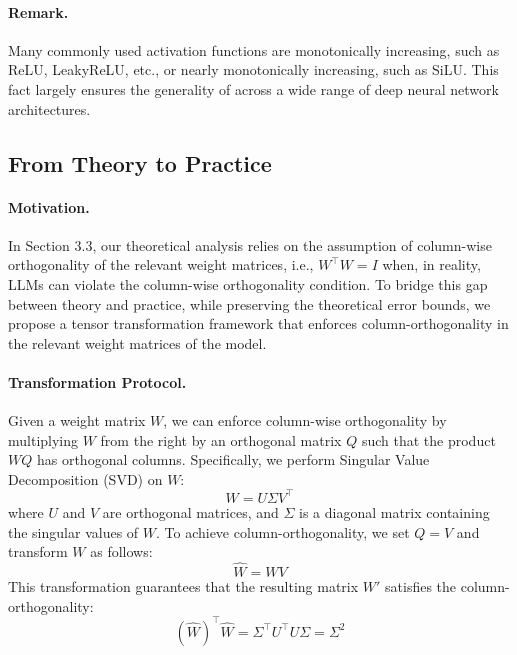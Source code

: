 \paragraph{Remark.} Many commonly used activation functions are monotonically increasing, such as ReLU, LeakyReLU, etc., or nearly monotonically increasing, such as SiLU.  This fact largely ensures the generality of \algacro{} across a wide range of deep neural network architectures.

\subsection{From Theory to Practice}

\paragraph{Motivation.} In Section 3.3, our theoretical analysis relies on the assumption of column-wise orthogonality of the relevant weight matrices, i.e., $W^\top W = I$ when, in reality, LLMs can violate the column-wise orthogonality condition. To bridge this gap between theory and practice, while preserving the theoretical error bounds, we propose a tensor transformation framework that enforces column-orthogonality in the relevant weight matrices of the model.

\paragraph{Transformation Protocol.} Given a weight matrix $W$, we can enforce column-wise orthogonality by multiplying $W$ from the right by an orthogonal matrix $Q$ such that the product $WQ$ has orthogonal columns. Specifically, we perform Singular Value Decomposition (SVD) on $W$:
\[
W = U \Sigma V^\top
\]
where $U$ and $V$ are orthogonal matrices, and $\Sigma$ is a diagonal matrix containing the singular values of $W$. To achieve column-orthogonality, we set $Q = V$ and transform $W$ as follows:
\[
\hat W = W V
\]
This transformation guarantees that the resulting matrix $W'$ satisfies the column-orthogonality:
\begin{equation}
(\hat W)^\top \hat W = \Sigma^\top U^\top U \Sigma = \Sigma^2
\end{equation}

